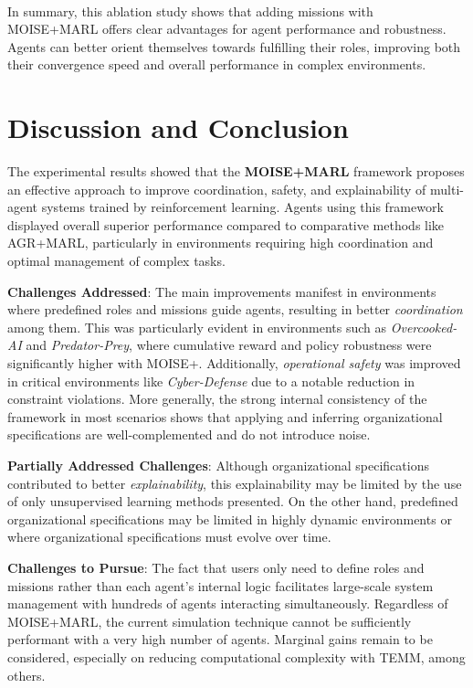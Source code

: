 \documentclass[sigconf,anonymous]{aamas}
\begin{document}
\

In summary, this ablation study shows that adding missions with MOISE+MARL offers clear advantages for agent performance and robustness. Agents can better orient themselves towards fulfilling their roles, improving both their convergence speed and overall performance in complex environments.


\section{Discussion and Conclusion}
\label{sec:discussion_conclusion}


The experimental results showed that the \textbf{MOISE+MARL} framework proposes an effective approach to improve coordination, safety, and explainability of multi-agent systems trained by reinforcement learning. Agents using this framework displayed overall superior performance compared to comparative methods like AGR+MARL, particularly in environments requiring high coordination and optimal management of complex tasks.

\textbf{Challenges Addressed}: The main improvements manifest in environments where predefined roles and missions guide agents, resulting in better \textit{coordination} among them. This was particularly evident in environments such as \textit{Overcooked-AI} and \textit{Predator-Prey}, where cumulative reward and policy robustness were significantly higher with MOISE+. Additionally, \textit{operational safety} was improved in critical environments like \textit{Cyber-Defense} due to a notable reduction in constraint violations. More generally, the strong internal consistency of the framework in most scenarios shows that applying and inferring organizational specifications are well-complemented and do not introduce noise.

\textbf{Partially Addressed Challenges}: Although organizational specifications contributed to better \textit{explainability}, this explainability may be limited by the use of only unsupervised learning methods presented. On the other hand, predefined organizational specifications may be limited in highly dynamic environments or where organizational specifications must evolve over time.

\textbf{Challenges to Pursue}: The fact that users only need to define roles and missions rather than each agent's internal logic facilitates large-scale system management with hundreds of agents interacting simultaneously. Regardless of MOISE+MARL, the current simulation technique cannot be sufficiently performant with a very high number of agents. Marginal gains remain to be considered, especially on reducing computational complexity with TEMM, among others.
\end{document}
